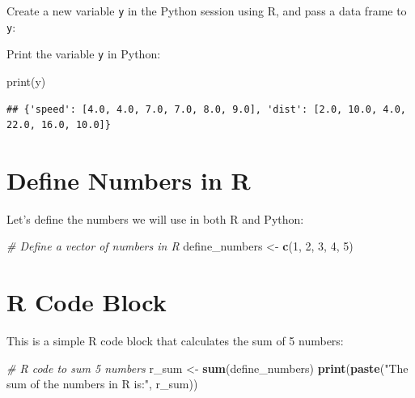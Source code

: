 \documentclass[
  12 pt,
  a4paper,
]{book}
\newenvironment{Shaded}{\begin{snugshade}}{\end{snugshade}}
\newcommand{\BuiltInTok}[1]{#1}
\newcommand{\CommentTok}[1]{\textcolor[rgb]{0.56,0.35,0.01}{\textit{#1}}}
\newcommand{\DecValTok}[1]{\textcolor[rgb]{0.00,0.00,0.81}{#1}}
\newcommand{\FunctionTok}[1]{\textcolor[rgb]{0.13,0.29,0.53}{\textbf{#1}}}
\newcommand{\NormalTok}[1]{#1}
\newcommand{\OtherTok}[1]{\textcolor[rgb]{0.56,0.35,0.01}{#1}}
\newcommand{\SpecialCharTok}[1]{\textcolor[rgb]{0.81,0.36,0.00}{\textbf{#1}}}
\newcommand{\StringTok}[1]{\textcolor[rgb]{0.31,0.60,0.02}{#1}}
\numberwithin{equation}{section}
\theoremstyle{plain}      %
\theoremstyle{definition} %
\theoremstyle{remark}     %
\theoremstyle{note}         %
\begin{document}
Create a new variable \texttt{y} in the Python session using R, and pass
a data frame to \texttt{y}:

\begin{Shaded}
\end{Shaded}

Print the variable \texttt{y} in Python:

\begin{Shaded}
\begin{Highlighting}[]
\BuiltInTok{print}\NormalTok{(y)}
\end{Highlighting}
\end{Shaded}

\begin{verbatim}
## {'speed': [4.0, 4.0, 7.0, 7.0, 8.0, 9.0], 'dist': [2.0, 10.0, 4.0, 22.0, 16.0, 10.0]}
\end{verbatim}

\newpage

\hypertarget{define-numbers-in-r}{%
\section{Define Numbers in R}\label{define-numbers-in-r}}

Let's define the numbers we will use in both R and Python:

\begin{Shaded}
\begin{Highlighting}[]
\CommentTok{\# Define a vector of numbers in R}
\NormalTok{define\_numbers }\OtherTok{\textless{}{-}} \FunctionTok{c}\NormalTok{(}\DecValTok{1}\NormalTok{, }\DecValTok{2}\NormalTok{, }\DecValTok{3}\NormalTok{, }\DecValTok{4}\NormalTok{, }\DecValTok{5}\NormalTok{)}
\end{Highlighting}
\end{Shaded}

\hypertarget{r-code-block}{%
\section{R Code Block}\label{r-code-block}}

This is a simple R code block that calculates the sum of 5 numbers:

\begin{Shaded}
\begin{Highlighting}[]
\CommentTok{\# R code to sum 5 numbers}
\NormalTok{r\_sum }\OtherTok{\textless{}{-}} \FunctionTok{sum}\NormalTok{(define\_numbers)}
\FunctionTok{print}\NormalTok{(}\FunctionTok{paste}\NormalTok{(}\StringTok{"The sum of the numbers in R is:"}\NormalTok{, r\_sum))}
\end{Highlighting}
\end{Shaded}
\end{document}
